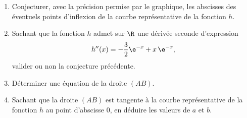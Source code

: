 \begin{enumerate}
	\item Conjecturer, avec la précision permise par le graphique, les abscisses des éventuels points d'inflexion de la courbe représentative de la fonction $h$.
	\item Sachant que la fonction $h$ admet sur $\R$ une dérivée seconde d'expression \[ h''(x)=-\dfrac32\e^{-x}+x\,\e^{-x},\]%
	valider ou non la conjecture précédente.
	\item Déterminer une équation de la droite $(AB)$.
	\item Sachant que la droite $(AB)$ est tangente à la courbe représentative de la fonction $h$ au point d'abscisse $0$, en déduire les valeurs de $a$ et $b$.
\end{enumerate}
